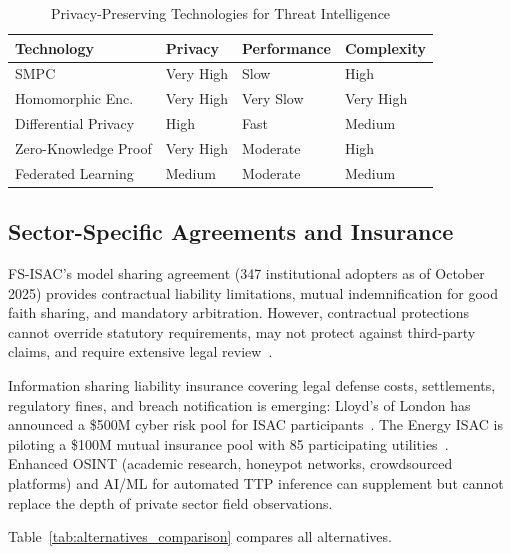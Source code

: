 \documentclass[journal]{IEEEtran}
\begin{document}
\begin{table}[!t]
\caption{Privacy-Preserving Technologies for Threat Intelligence}
\centering\small
\begin{tabular}{@{}p{2.0cm}lll@{}}
\toprule
\textbf{Technology} & \textbf{Privacy} & \textbf{Performance} & \textbf{Complexity} \\
\midrule
SMPC                & Very High & Slow      & High \\
Homomorphic Enc.    & Very High & Very Slow & Very High \\
Differential Privacy & High     & Fast      & Medium \\
Zero-Knowledge Proof & Very High & Moderate & High \\
Federated Learning  & Medium    & Moderate  & Medium \\
\bottomrule
\end{tabular}
\label{tab:privacy_tech}
\end{table}

\subsection{Sector-Specific Agreements and Insurance}

FS-ISAC's model sharing agreement (347 institutional adopters as of October 2025) provides contractual liability limitations, mutual indemnification for good faith sharing, and mandatory arbitration. However, contractual protections cannot override statutory requirements, may not protect against third-party claims, and require extensive legal review~\cite{fsisac2024agreement}.

Information sharing liability insurance covering legal defense costs, settlements, regulatory fines, and breach notification is emerging: Lloyd's of London has announced a \$500M cyber risk pool for ISAC participants~\cite{lloyds2025cyber}. The Energy ISAC is piloting a \$100M mutual insurance pool with 85 participating utilities~\cite{eisac2025mutual}. Enhanced OSINT (academic research, honeypot networks, crowdsourced platforms) and AI/ML for automated TTP inference can supplement but cannot replace the depth of private sector field observations.

Table~\ref{tab:alternatives_comparison} compares all alternatives.
\end{document}

